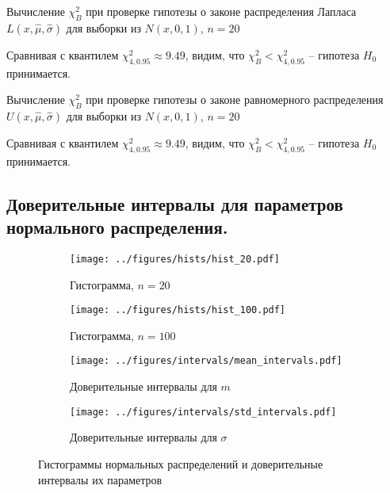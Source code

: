 \documentclass[12pt]{article}
\begin{document}
	\begin{table}[H]
		\centering
		
		\caption{Вычисление $\chi^2_B$ при проверке гипотезы о законе распределения Лапласа $L(x, \widehat{\mu}, \widehat{\sigma})$ для выборки из $N(x, 0, 1)$, $n = 20$}
	\end{table}

	Сравнивая с квантилем $\chi^2_{4, 0.95} \approx 9.49$, видим, что  $\chi^2_B < \chi^2_{4, 0.95}$ -- гипотеза $H_0$ принимается.
	
	\begin{table}[H]
		\centering
		
		\caption{Вычисление $\chi^2_B$ при проверке гипотезы о законе равномерного распределения $U(x, \widehat{\mu}, \widehat{\sigma})$ для выборки из $N(x, 0, 1)$, $n = 20$}
	\end{table}

	Сравнивая с квантилем $\chi^2_{4, 0.95} \approx 9.49$, видим, что  $\chi^2_B < \chi^2_{4, 0.95}$ -- гипотеза $H_0$ принимается.
	
	\subsection{Доверительные интервалы для параметров нормального распределения.}
	
	\begin{figure}[H]
		\centering
		\begin{subfigure}[t]{.45\linewidth}
			\centering\texttt{[image: ../figures/hists/hist\_20.pdf]}
			\caption*{Гистограмма, $n=20$}
		\end{subfigure}
		\begin{subfigure}[t]{.45\linewidth}
			\centering\texttt{[image: ../figures/hists/hist\_100.pdf]}
			\caption*{Гистограмма, $n=100$}
		\end{subfigure}
		\begin{subfigure}[t]{.45\linewidth}
			\centering\texttt{[image: ../figures/intervals/mean\_intervals.pdf]}
			\caption*{Доверительные интервалы для $m$}
		\end{subfigure}
		\begin{subfigure}[t]{.45\linewidth}
			\centering\texttt{[image: ../figures/intervals/std\_intervals.pdf]}
			\caption*{Доверительные интервалы для $\sigma$}
		\end{subfigure}
		\caption{Гистограммы нормальных распределений и доверительные интервалы их параметров}
	\end{figure}
\end{document}
